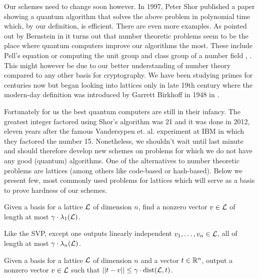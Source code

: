 Our schemes need to change soon however. In 1997, Peter Shor published a paper \cite{shor} showing a quantum algorithm that solves the above problem in polynomial time which, by our definition, is efficient. There are even more examples. As pointed out by Bernstein in \cite{bernstein} it turns out that number theoretic problems seem to be the place where quantum computers improve our algorithms the most. These include Pell's equation \cite{pell} or computing the unit group and class group of a number field \cite{17}, \cite{37}. This might however be due to our better understanding of number theory compared to any other basis for cryptography. We have been studying primes for centuries now but began looking into lattices only in late 19th century where the modern-day definition was introduced by Garrett Birkhoff in 1948 in \cite{birkhoff}.

Fortunately for us the best quantum computers are still in their infancy. The greatest integer factored using Shor's algorithm was 21 \cite{21} and it was done in 2012, eleven years after the famous Vandersypen et. al. experiment at IBM \cite{15} in which they factored the number 15. Nonetheless, we shouldn't wait until last minute and should therefore develop new schemes on problems for which we do not have any good (quantum) algorithms. One of the alternatives to number theoretic problems are lattices (among others like code-based or hash-based). Below we present few, most commonly used problems for lattices which will serve as a basis to prove hardness of our schemes.
\begin{definition}
	Given a basis for a lattice $\mathcal{L}$ of dimension $n$, find a nonzero vector $v \in \mathcal{L}$ of length at most $\gamma \cdot \lambda_1(\mathcal{L})$.
\end{definition}

\begin{definition}
	Like the SVP, except one outputs linearly independent $v_1,\ldots , v_n\in \mathcal{L}$, all of length at most $\gamma \cdot \lambda_n(\mathcal{L})$.
\end{definition}
\begin{definition}
	Given a basis for a lattice $\mathcal{L}$ of dimension $n$ and a vector $t \in \mathbb{R}^n$, output a nonzero vector $v \in \mathcal{L}$ such that $||t - v|| \leq \gamma \cdot \text{dist}(\mathcal{L}, t)$.
\end{definition}

